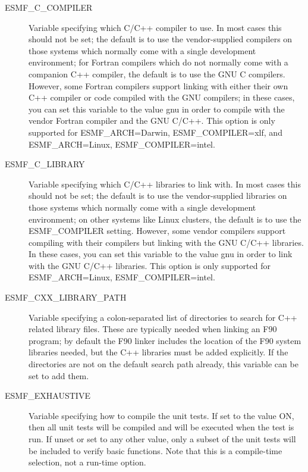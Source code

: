 \begin{description}
\item[ESMF\_C\_COMPILER]

Variable specifying which C/C++ compiler to use.   In most cases this should
not be set; the default is to use the vendor-supplied compilers on those
systems which normally come with a single development environment; for
Fortran compilers which do not normally come with a companion C++ compiler,
the default is to use the GNU C compilers.  However, some Fortran compilers
support linking with either their own C++ compiler or code compiled with the
GNU compilers; in these cases, you can set this variable to the value gnu in
order to compile with the vendor Fortran compiler and the GNU C/C++.   This
option is only supported for ESMF\_ARCH=Darwin, ESMF\_COMPILER=xlf, and
ESMF\_ARCH=Linux, ESMF\_COMPILER=intel.

\item[ESMF\_C\_LIBRARY]

Variable specifying which C/C++ libraries to link with.  In most cases this
should not be set; the default is to use the vendor-supplied libraries on
those systems which normally come with a single development environment; on
other systems like Linux clusters, the default is to use the ESMF\_COMPILER
setting.  However, some vendor compilers support compiling with their
compilers but linking with the GNU C/C++ libraries.  In these cases, you can
set this variable to the value gnu in order to link with the GNU C/C++
libraries.  This option is only supported for ESMF\_ARCH=Linux,
ESMF\_COMPILER=intel.

\item[ESMF\_CXX\_LIBRARY\_PATH]

Variable specifying a colon-separated list of directories to
search for C++ related library files.  These are typically needed
when linking an F90 program; by default the F90 linker includes
the location of the F90 system libraries needed, but the C++ libraries
must be added explicitly.  If the directories are not on the
default search path already, this variable can be set to add them.

\item[ESMF\_EXHAUSTIVE] 

Variable specifying how to compile the unit tests.  If set to the value ON,
then all unit tests will be compiled and will be executed when the test is
run.  If unset or set to any other value, only a subset of the unit tests
will be included to verify basic functions.  Note that this is a compile-time
selection, not a run-time option.


\end{description}
